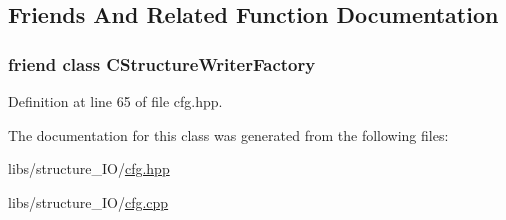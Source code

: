 \subsection{Friends And Related Function Documentation}
\hypertarget{class_q_s_t_e_m_1_1_c_cfg_writer_af47b382d447249dc45c11034c1277af4}{
\subsubsection[{C\-Structure\-Writer\-Factory}]{\setlength{\rightskip}{0pt plus 5cm}friend class {\bf C\-Structure\-Writer\-Factory}\hspace{0.3cm}{\ttfamily [friend]}}}\label{class_q_s_t_e_m_1_1_c_cfg_writer_af47b382d447249dc45c11034c1277af4}


Definition at line 65 of file cfg.\-hpp.



The documentation for this class was generated from the following files\-:\begin{DoxyCompactItemize}
\item 
libs/structure\-\_\-\-I\-O/\hyperlink{cfg_8hpp}{cfg.\-hpp}\item 
libs/structure\-\_\-\-I\-O/\hyperlink{cfg_8cpp}{cfg.\-cpp}\end{DoxyCompactItemize}
